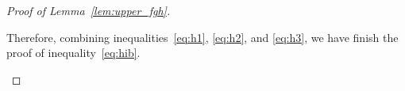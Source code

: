\documentclass[lettersize,journal]{IEEEtran}
\theoremstyle{definition}
\theoremstyle{definition}
\begin{document}
\begin{proof}[Proof of Lemma~\ref{lem:upper_fgh}]
\begin{enumerate}
    Therefore, combining inequalities~\eqref{eq:h1}, \eqref{eq:h2}, and \eqref{eq:h3}, we have finish the proof of inequality~\eqref{eq:hib}.

\end{enumerate}


\end{proof}
\end{document}
